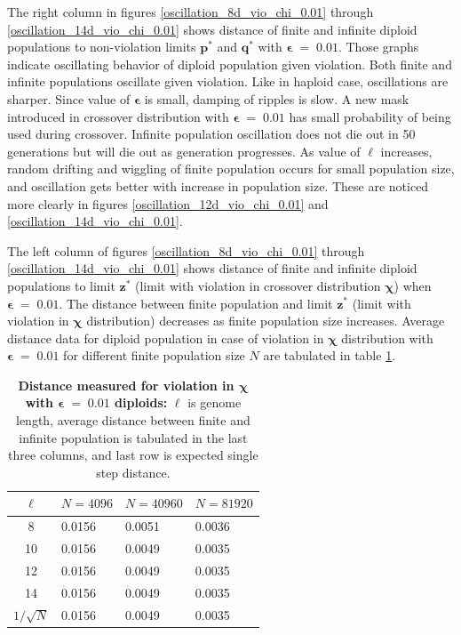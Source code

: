 \clearpage

The right column in figures \ref{oscillation_8d_vio_chi_0.01} through \ref{oscillation_14d_vio_chi_0.01} 
shows distance of finite and infinite diploid populations to non-violation limits $\bm{p^\ast}$ and $\bm{q^\ast}$ with $\bm{\epsilon} \;=\; 0.01$. 
Those graphs indicate oscillating behavior of diploid population given violation. 
Both finite and infinite populations oscillate given violation. Like in haploid case, oscillations are sharper. Since value of $\bm{\epsilon}$ 
is small, damping of ripples is slow. A new mask introduced in crossover distribution with $\bm{\epsilon} \;=\; 0.01$ has small 
probability of being used during crossover. Infinite population oscillation does not die out in 50 generations 
but will die out as generation progresses. As value of $\ell$ 
increases, random drifting and wiggling of finite population occurs for small population size, 
and oscillation gets better with increase in population size. 
These are noticed more clearly in figures \ref{oscillation_12d_vio_chi_0.01} and \ref{oscillation_14d_vio_chi_0.01}.

The left column of figures \ref{oscillation_8d_vio_chi_0.01} through \ref{oscillation_14d_vio_chi_0.01} 
shows distance of finite and infinite diploid populations to limit $\bm{z^\ast}$ 
(limit with violation in crossover distribution $\bm{\chi}$) when $\bm{\epsilon} \;=\; 0.01$. 
The distance between finite population and limit $\bm{z}^\ast$ (limit with violation in $\bm{\chi}$ distribution) 
decreases as finite population size increases. 
Average distance data for diploid population in case of violation in $\bm{\chi}$ distribution 
with $\bm{\epsilon} \;=\; 0.01$ for different finite population size $N$ are tabulated in table \ref{distanceChiDipEps0.01}.


\begin{table}[ht]
\caption[\textbf{Distance measured for violation in $\bm{\chi}$ with $\bm{\epsilon} \;=\; 0.01$ diploids}]{\textbf{Distance measured for violation in $\bm{\chi}$ with $\bm{\epsilon} \;=\; 0.01$ diploids:} $\ell$ is genome length, 
average distance between finite and infinite population is tabulated in the last three columns, and last row is expected single step distance.}
\centering
\begin{tabularx}{0.75\textwidth}{ c *{3}{X}}
\toprule
$\ell$ & $N = 4096$ & $N = 40960$ & $N = 81920$  \\
\midrule
8 & 0.0156	&  0.0051	& 0.0036 \\
10 & 0.0156	&  0.0049	& 0.0035 \\
12 & 0.0156	&  0.0049	& 0.0035 \\
14 & 0.0156	&  0.0049	& 0.0035 \\
\midrule
$1/\sqrt{N}$ & 0.0156 & 0.0049 & 0.0035 \\
\bottomrule
\end{tabularx}
\label{distanceChiDipEps0.01}
\end{table} 

